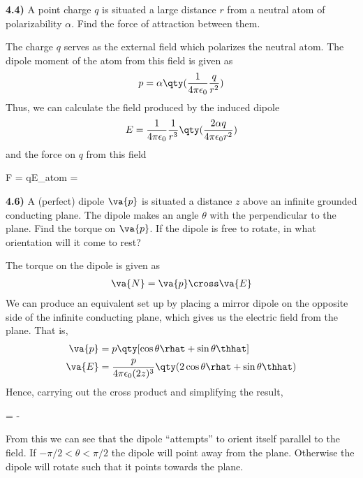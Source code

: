 \documentclass[12pt,a4paper]{article}
\newcommand{\prob}[2]{\textbf{#1)} #2}
\begin{document}
\prob{4.4}{A point charge $q$ is situated a large distance $r$ from a neutral atom of polarizability $\alpha$. Find the force of attraction between them.}

The charge $q$ serves as the external field which polarizes the neutral atom. The dipole moment of the atom from this field is given as
\begin{align*}
p = \alpha\qty(\frac{1}{4\pi\epsilon_0}\frac{q}{r^2})
\end{align*}
Thus, we can calculate the field produced by the induced dipole
\begin{align*}
E = \frac{1}{4\pi\epsilon_0}\frac{1}{r^3}\qty(\frac{2\alpha q}{4\pi\epsilon_0 r^2})
\end{align*}
and the force on $q$ from this field 
\begin{eqbox}
F = qE_{\rm atom} = 
\end{eqbox}

\prob{4.6}{A (perfect) dipole $\va{p}$ is situated a distance $z$ above an infinite grounded conducting plane. The dipole makes an angle $\theta$ with the perpendicular to the plane. Find the torque on $\va{p}$. If the dipole is free to rotate, in what orientation will it come to rest?}

The torque on the dipole is given as
\begin{align*}
\va{N} = \va{p} \cross \va{E}
\end{align*}
We can produce an equivalent set up by placing a mirror dipole on the opposite side of the infinite conducting plane, which gives us the electric field from the plane. That is,
\begin{align*}
\va{p} &= p\qty[\cos{\theta}\rhat + \sin{\theta}\thhat] \\
\va{E} &= \frac{p}{4\pi\epsilon_0(2z)^3}\qty(2\cos{\theta}\rhat + \sin{\theta}\thhat)
\end{align*}
Hence, carrying out the cross product and simplifying the result,
\begin{eqbox}
 = -\phihat
\end{eqbox}
From this we can see that the dipole ``attempts'' to orient itself parallel to the field. If $-\pi/2 < \theta < \pi/2$ the dipole will point away from the plane. Otherwise the dipole will rotate such that it points towards the plane. 
\end{document}
